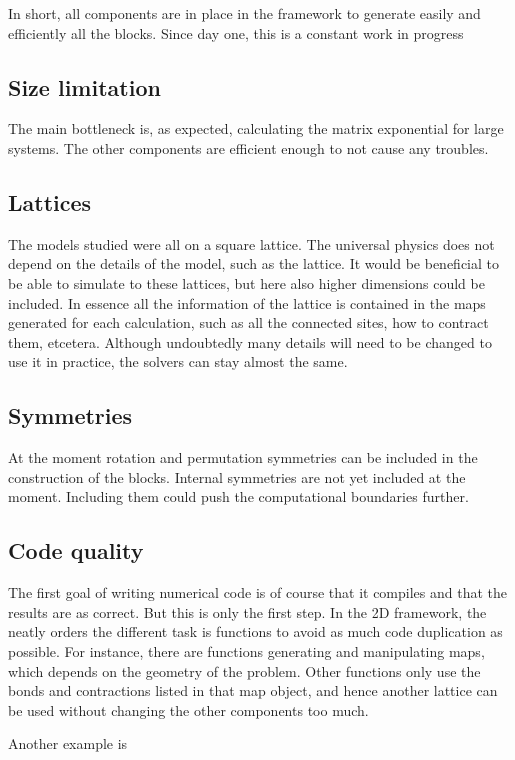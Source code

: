 
In short, all components are in place in the framework to generate easily and efficiently all the blocks. Since day one, this is a constant work in progress

\subsection{Size limitation}
The main bottleneck is, as expected, calculating the matrix exponential for large systems. The other components are efficient enough to not cause any troubles.

\subsection{Lattices}
The models studied were all on a square lattice. The universal physics does not depend on the details of the model, such as the lattice. It would be beneficial to be able to simulate to these lattices, but here also higher dimensions could be included. In essence all the information of the lattice is contained in the maps generated for each calculation, such as all the connected sites, how to contract them, etcetera. Although undoubtedly many details will need to be changed to use it in practice, the solvers can stay almost the same.

\subsection{Symmetries}

At the moment rotation and permutation symmetries can be included in the construction of the blocks. Internal symmetries are not yet included at the moment. Including them could push the computational boundaries further.

\subsection{Code quality}
The first goal of writing numerical code is of course that it compiles and that the results are as correct. But this is only the first step. In the 2D framework, the neatly orders the different task is functions to avoid as much code duplication as possible. For instance, there are functions generating and manipulating maps, which depends on the geometry of the problem. Other functions only use the bonds and contractions listed in that map object, and hence another lattice can be used without changing the other components too much.

Another example is

